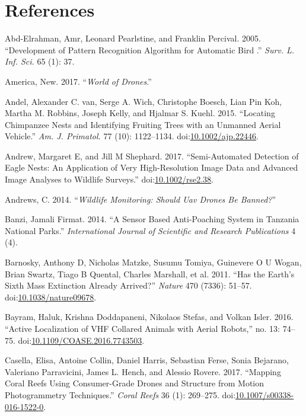 \documentclass[]{interact}
\theoremstyle{plain}%
\theoremstyle{definition}
\theoremstyle{remark}
\begin{document}
\section*{References}\label{references}

\hypertarget{refs}{}
\hypertarget{ref-abd-elrahman_development_2005}{}
Abd-Elrahman, Amr, Leonard Pearlstine, and Franklin Percival. 2005.
``Development of Pattern Recognition Algorithm for Automatic Bird .''
\emph{Surv. L. Inf. Sci.} 65 (1): 37.

\hypertarget{ref-Bworld_of_drones2017}{}
America, New. 2017. ``\emph{World of Drones}.''

\hypertarget{ref-van_andel_locating_2015}{}
Andel, Alexander C. van, Serge A. Wich, Christophe Boesch, Lian Pin Koh,
Martha M. Robbins, Joseph Kelly, and Hjalmar S. Kuehl. 2015. ``Locating
Chimpanzee Nests and Identifying Fruiting Trees with an Unmanned Aerial
Vehicle.'' \emph{Am. J. Primatol.} 77 (10): 1122--1134.
doi:\href{https://doi.org/10.1002/ajp.22446}{10.1002/ajp.22446}.

\hypertarget{ref-andrew_semi-automated_2017}{}
Andrew, Margaret E, and Jill M Shephard. 2017. ``Semi-Automated
Detection of Eagle Nests: An Application of Very High-Resolution Image
Data and Advanced Image Analyses to Wildlife Surveys.''
doi:\href{https://doi.org/10.1002/rse2.38}{10.1002/rse2.38}.

\hypertarget{ref-Andrews2014}{}
Andrews, C. 2014. ``\emph{Wildlife Monitoring: Should Uav Drones Be
Banned?}''

\hypertarget{ref-banzi_sensor_2014}{}
Banzi, Jamali Firmat. 2014. ``A Sensor Based Anti-Poaching System in
Tanzania National Parks.'' \emph{International Journal of Scientific and
Research Publications} 4 (4).

\hypertarget{ref-barnosky_has_2011}{}
Barnosky, Anthony D, Nicholas Matzke, Susumu Tomiya, Guinevere O U
Wogan, Brian Swartz, Tiago B Quental, Charles Marshall, et al. 2011.
``Has the Earth's Sixth Mass Extinction Already Arrived?'' \emph{Nature}
470 (7336): 51--57.
doi:\href{https://doi.org/10.1038/nature09678}{10.1038/nature09678}.

\hypertarget{ref-bayram_active_2016}{}
Bayram, Haluk, Krishna Doddapaneni, Nikolaos Stefas, and Volkan Isler.
2016. ``Active Localization of VHF Collared Animals with Aerial
Robots,'' no. 13: 74--75.
doi:\href{https://doi.org/10.1109/COASE.2016.7743503}{10.1109/COASE.2016.7743503}.

\hypertarget{ref-casella_mapping_2017}{}
Casella, Elisa, Antoine Collin, Daniel Harris, Sebastian Ferse, Sonia
Bejarano, Valeriano Parravicini, James L. Hench, and Alessio Rovere.
2017. ``Mapping Coral Reefs Using Consumer-Grade Drones and Structure
from Motion Photogrammetry Techniques.'' \emph{Coral Reefs} 36 (1):
269--275.
doi:\href{https://doi.org/10.1007/s00338-016-1522-0}{10.1007/s00338-016-1522-0}.
\end{document}
